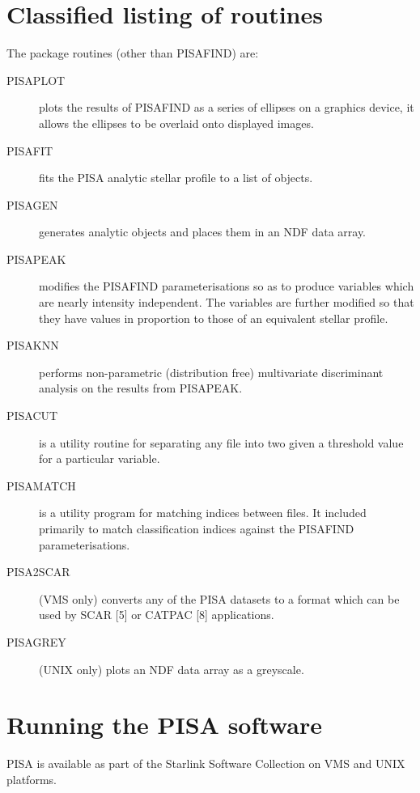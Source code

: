 \section{Classified listing of routines}

The package routines (other than PISAFIND) are:
\begin{description}

\item [PISAPLOT] plots the results of PISAFIND as a series of ellipses
on a graphics device, it allows the ellipses to be overlaid onto
displayed images.

\item [PISAFIT] fits the PISA analytic stellar profile to a list of
objects.

\item [PISAGEN] generates analytic objects and places them in an NDF
data array.

\item [PISAPEAK] modifies the PISAFIND parameterisations so as to
produce variables which are nearly intensity independent. The variables
are further modified so that they have values in proportion to those of
an equivalent stellar profile.

\item [PISAKNN] performs non-parametric (distribution free)
multivariate discriminant analysis on the results from PISAPEAK.

\item [PISACUT] is a utility routine for separating any file
into two given a threshold value for a particular variable.

\item [PISAMATCH] is a utility program for matching indices between
files. It included primarily to match classification indices 
against the PISAFIND parameterisations.

\item [PISA2SCAR] (VMS only) converts any of the PISA datasets to a
format which can be used by SCAR [5] or CATPAC [8] applications.

\item [PISAGREY] (UNIX only) plots an NDF data array as a greyscale.
\end{description}

\section{Running the PISA software}

PISA is available as part of the Starlink Software Collection on VMS and
UNIX platforms.

